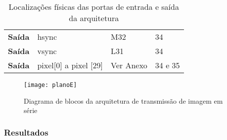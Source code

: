 \begin{table}[h!]
\begin{tabular}{rlll}
		\multicolumn{1}{r|}{\textbf{Saída}}   & hsync                                  & M32                                      & 34                                         \\
		\multicolumn{1}{r|}{\textbf{Saída}}   & vsync                                  & L31                                      & 34                                         \\
		\multicolumn{1}{r|}{\textbf{Saída}}   & pixel{[}0{]} a pixel {[}29{]}          & Ver Anexo                                & 34 e 35                                    \\ \hline
	\end{tabular}
	\caption{Localizações físicas das portas de entrada e saída da arquitetura}
	\label{table:LOC_simples_planE}
\end{table}



\begin{figure}[h!]
	\begin{center}
		\leavevmode
		\texttt{[image: planoE]}
		\captionsetup{width=1.0\linewidth}
		\caption[Diagrama de blocos da arquitetura de transmissão de imagem em série]{Diagrama de blocos da arquitetura de transmissão de imagem em série}
		\label{fig:recetorHDMI}
	\end{center}
\end{figure}

\subsubsection{Resultados} \label{subsub:serial_planEresults}